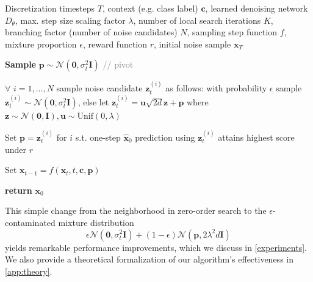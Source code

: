 \documentclass{article}
\newcommand{\x}{\mathbf{x}}
\begin{document}
\begin{algorithm}[t]
\caption{$\epsilon$-greedy noise search}
\label{alg:epsgreedy}
\begin{algorithmic}[1]
\Require Discretization timesteps $T$, 
         context (e.g. class label) $\mathbf{c}$,
         learned denoising network $D_\theta$,
         max. step size scaling factor $\lambda$, number of local search iterations $K$, branching factor (number of noise candidates) $N$, sampling step function $f$, mixture proportion $\epsilon$, reward function $r$, initial noise sample $\x_T$


\vspace{1mm}

    \textbf{Sample} $\mathbf{p} \sim \mathcal{N}(\mathbf{0},\sigma_t^2\mathbf{I})$ \textcolor{gray}{// pivot}


        $\forall$ $i = 1, \dots, N$ sample noise candidate $\mathbf{z}^{(i)}_t$ as follows: with probability $\epsilon$ sample $\mathbf{z}^{(i)}_t \sim \mathcal{N}(\mathbf{0},\sigma_t^2\mathbf{I})$, else let $\mathbf{z}^{(i)}_t = {\mathbf{u}\sqrt{2d}} \mathbf{z} + \mathbf{p}$ where $\mathbf{z} \sim \mathcal{N}(\mathbf{0},\mathbf{I}), \mathbf{u} \sim \textrm{Unif}(0,\lambda)$
        
        Set $\mathbf{p} = \mathbf{z}^{(i)}_t$ for $i$ s.t. one-step $\hat{\x}_0$ prediction using $\mathbf{z}^{(i)}_t$ attains highest score under $r$
    
    \EndFor

    Set $\x_{t-1} = f(\x_t,t,\mathbf{c},\mathbf{p})$

    
\EndFor

\State \textbf{return} $\x_0$
\end{algorithmic}
\end{algorithm}

This simple change from the neighborhood in zero-order search to the $\epsilon$-contaminated mixture distribution $$\epsilon \mathcal{N}(\mathbf{0},\sigma_t^2\mathbf{I}) + (1-\epsilon)\mathcal{N}(\mathbf{p}, 2\lambda^2d\mathbf{I})$$ yields remarkable performance improvements, which we discuss in \autoref{experiments}. We also provide a theoretical formalization of our algorithm's effectiveness in \autoref{app:theory}.


\end{document}
